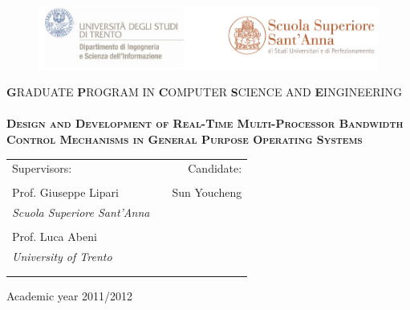 \thispagestyle{empty}
\begin{center}
\begin{figure}[htbp]
        \centering
        \includegraphics[width=\textwidth]{images/logo}
\end{figure}
\vskip5mm
\textsc{{\bf\large G}RADUATE {\bf\large P}ROGRAM IN {\bf\large C}OMPUTER 
	{\bf\large S}CIENCE AND {\bf\large E}INGINEERING} \\
\hrulefill \\%
\vfill
\textsc{ %
\textbf{\huge Design and Development of Real-Time Multi-Processor Bandwidth
	Control Mechanisms in General Purpose Operating Systems\\}
}
\vfill
\vskip20mm

\begin{tabular*}{\textwidth}{@{\extracolsep{\fill}}lcr}
Supervisors:                        & \hfill & Candidate: \\
& & \\
Prof. Giuseppe Lipari                & \hfill & Sun Youcheng\\
\emph{\scriptsize Scuola Superiore Sant'Anna } & \hfill & \\
& & \\
Prof. Luca Abeni   & \hfill & \\
\emph{\scriptsize University of Trento }        & \hfill & \\
& & \\
& & \\
\end{tabular*}


\par
Academic year 2011/2012
\end{center}
